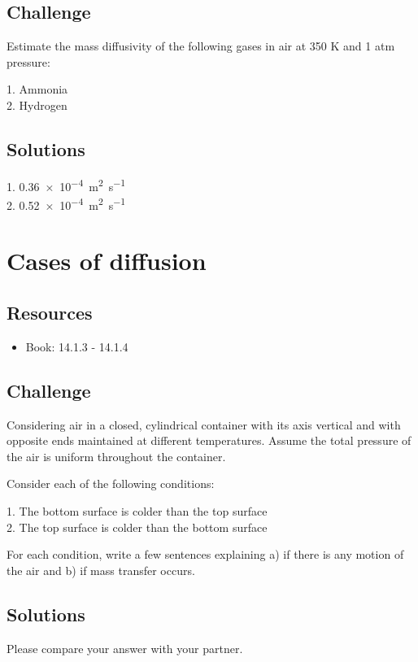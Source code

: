 \subsection*{Challenge}
Estimate the mass diffusivity of the following gases in air at 350 K and 1 atm pressure:

1. Ammonia\\
2. Hydrogen

\subsection*{Solutions}
1. \SI{0.36e-4}{\square\meter\per\second}\\
2. \SI{0.52e-4}{\square\meter\per\second}




\newpage
\section{Cases of diffusion}

\subsection*{Resources}
\begin{itemize}
    \item Book: 14.1.3 - 14.1.4
\end{itemize}

\subsection*{Challenge}
Considering air in a closed, cylindrical container with its axis vertical and with opposite ends maintained at different temperatures. Assume the total pressure of the air is uniform throughout the container.

Consider each of the following conditions:

1. The bottom surface is colder than the top surface\\
2. The top surface is colder than the bottom surface

For each condition, write a few sentences explaining a) if there is any motion of the air and b) if mass transfer occurs.

\subsection*{Solutions}
Please compare your answer with your partner.




